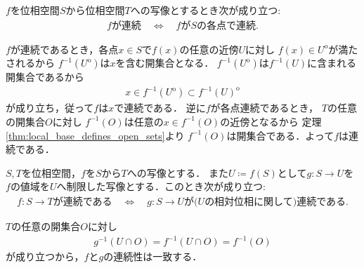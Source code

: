 	\begin{screen}
		\begin{thm}
		\label{thm:continuous_on_every_point_iff_continuous}
			$f$を位相空間$S$から位相空間$T$への写像とするとき次が成り立つ:
			\begin{align}
				\mbox{$f$が連続} \quad \Longleftrightarrow \quad
				\mbox{$f$が$S$の各点で連続}.
			\end{align}
		\end{thm}
	\end{screen}
	
	\begin{prf}
		$f$が連続であるとき，各点$x \in S$で$f(x)$の任意の近傍$U$に対し
		$f(x) \in U^{\mathrm{o}}$が満たされるから
		$f^{-1}(U^{\mathrm{o}})$は$x$を含む開集合となる．
		$f^{-1}(U^{\mathrm{o}})$は$f^{-1}(U)$に含まれる開集合であるから
		\begin{align}
			x \in f^{-1}(U^{\mathrm{o}}) \subset f^{-1}(U)^{\mathrm{o}}
		\end{align}
		が成り立ち，従って$f$は$x$で連続である．
		逆に$f$が各点連続であるとき，
		$T$の任意の開集合$O$に対し
		$f^{-1}(O)$は任意の$x \in f^{-1}(O)$の近傍となるから
		定理\ref{thm:local_base_defines_open_sets}より
		$f^{-1}(O)$は開集合である．よって$f$は連続である．
		\QED
	\end{prf}
	
	\begin{screen}
		\begin{thm}[部分空間と制限写像の連続性]
			$S,T$を位相空間，$f$を$S$から$T$への写像とする．
			また$U \coloneqq f(S)$として$g:S \longrightarrow U$を
			$f$の値域を$U$へ制限した写像とする．このとき次が成り立つ:
			\begin{align}
				\mbox{$f:S \longrightarrow T$が連続である} 
				\quad \Longleftrightarrow \quad
				\mbox{$g:S \longrightarrow U$が($U$の相対位相に関して)連続である}.
			\end{align}
		\end{thm}
	\end{screen}
	
	\begin{prf}
		$T$の任意の開集合$O$に対し
		\begin{align}
			g^{-1}(U \cap O) = f^{-1}(U \cap O) = f^{-1}(O)
		\end{align}
		が成り立つから，$f$と$g$の連続性は一致する．
		\QED
	\end{prf}
	

